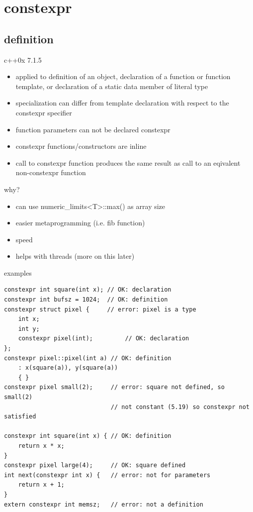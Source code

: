 \documentclass{beamer}
\begin{document}
\section{constexpr}
\subsection{definition}
\begin{frame}{c++0x 7.1.5}
  \begin{block}{}
    \begin{itemize}
    \item applied to definition of an object, declaration of a
      function or function template, or declaration of a static data
      member of literal type
    \item specialization can differ from template declaration with
      respect to the constexpr specifier
    \item function parameters can not be declared constexpr
    \item constexpr functions/constructors are inline
    \item call to constexpr function produces the same result as call
      to an eqivalent non-constexpr function
    \end{itemize}
  \end{block}
\end{frame}

\begin{frame}{why?}
  \begin{block}{}
    \begin{itemize}
    \item can use numeric\_limits<T>::max() as array size
    \item easier metaprogramming (i.e. fib function)
    \item speed
    \item helps with threads (more on this later)
    \end{itemize}
  \end{block}
\end{frame}

\begin{frame}{examples}
  \begin{block}{}
\begin{verbatim}
constexpr int square(int x); // OK: declaration
constexpr int bufsz = 1024;  // OK: definition
constexpr struct pixel {     // error: pixel is a type
    int x;
    int y;
    constexpr pixel(int);         // OK: declaration
};
constexpr pixel::pixel(int a) // OK: definition
    : x(square(a)), y(square(a))
    { }
constexpr pixel small(2);     // error: square not defined, so small(2)
                              // not constant (5.19) so constexpr not satisfied

constexpr int square(int x) { // OK: definition
    return x * x;
}
constexpr pixel large(4);     // OK: square defined
int next(constexpr int x) {   // error: not for parameters
    return x + 1;
}
extern constexpr int memsz;   // error: not a definition

\end{verbatim}
  \end{block}
\end{frame}
\end{document}
